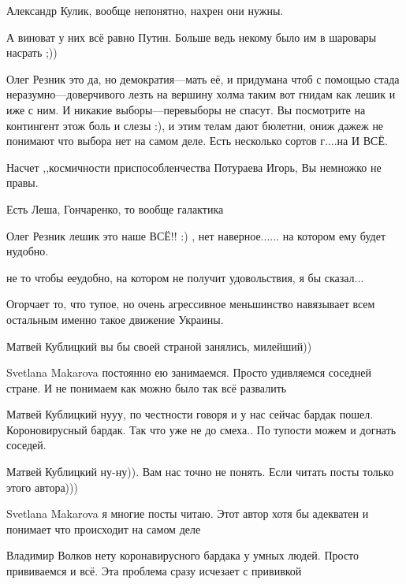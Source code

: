 \begin{itemize}
\begin{itemize}
Александр Кулик, вообще непонятно, нахрен они нужны.

А виноват у них всё равно Путин. Больше ведь некому было им в шаровары насрать ;))


Олег Резник это да, но демократия—мать её, и придумана чтоб с помощью стада
неразумно—доверчивого лезть на вершину холма таким вот гнидам как лешик и иже с
ним. И никакие выборы—перевыборы не спасут. Вы посмотрите на контингент этож
боль и слезы :), и этим телам дают бюлетни, ониж дажеж не понимают что выбора
нет на самом деле. Есть несколько сортов г....на И ВСЁ.
\end{itemize}

Насчет ,,космичности приспособленчества Потураева Игорь, Вы немножко не правы.

Есть Леша, Гончаренко, то вообще галактика


Олег Резник лешик это наше ВСЁ!! :) , нет наверное...... на котором ему будет нудобно.

не то чтобы ееудобно, на котором не получит удовольствия, я бы сказал...


Огорчает то, что тупое, но очень агрессивное меньшинство навязывает всем
остальным именно такое движение Украины.

\begin{itemize}
Матвей Кублицкий вы бы своей страной занялись, милейший))

Svetlana Makarova постоянно ею занимаемся. Просто удивляемся соседней стране. И не понимаем как можно было так всё развалить


Матвей Кублицкий нууу, по честности говоря и у нас сейчас бардак пошел.
Короновирусный бардак. Так что уже не до смеха.. По тупости можем и догнать
соседей. 

Матвей Кублицкий ну-ну)). Вам нас точно не понять. Если читать посты только этого автора)))

Svetlana Makarova я многие посты читаю. Этот автор хотя бы адекватен и понимает что происходит на самом деле

Владимир Волков нету коронавирусного бардака у умных людей. Просто прививаемся и всё. Эта проблема сразу исчезает с прививкой


\end{itemize}
\end{itemize}
